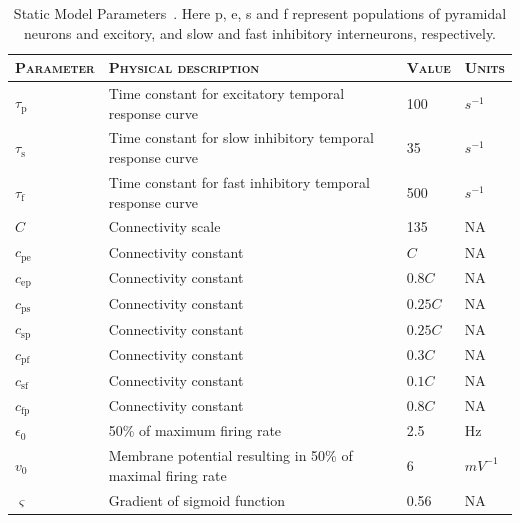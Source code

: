 \singlespacing 
\footnotesize
\begin{center}%
	\begin{table}
			\caption{Static Model Parameters~\citep{wendling2002epileptic}. Here p, e, s and f represent populations of pyramidal neurons and excitory, and slow and fast inhibitory interneurons, respectively.}
		\begin{tabular}{||p{2.5cm}|p{9cm}|p{1.2cm}|p{1cm}||}\hline
			 \textsc{Parameter}  & \textsc{Physical description} & \textsc{Value} & \textsc{Units}  \\\hline\hline
			 $\tau_{\mathrm{p}}$ & Time constant for excitatory temporal response curve & 100 & $s^{-1}$\\\hline
			 $\tau_{\mathrm{s}}$ & Time constant for slow inhibitory temporal response curve & 35 & $s^{-1}$\\\hline
			 $\tau_{\mathrm{f}}$ & Time constant for fast inhibitory temporal response curve & 500 & $s^{-1}$\\\hline
			 $C$ & Connectivity scale & 135 & NA\\\hline
			 $c_{\mathrm{pe}}$ & Connectivity constant  & $C$ & NA \\\hline
			 $c_{\mathrm{ep}}$ & Connectivity constant  & $0.8C$ & NA\\\hline
			 $c_{\mathrm{ps}}$ & Connectivity constant  & $0.25C$ & NA \\\hline
			 $c_{\mathrm{sp}}$ & Connectivity constant  & $0.25C$ & NA\\\hline
			 $c_{\mathrm{pf}}$ & Connectivity constant  & $0.3C$ & NA\\\hline
			 $c_{\mathrm{sf}}$ & Connectivity constant  & $0.1C$ & NA\\\hline
			 $c_{\mathrm{fp}}$ & Connectivity constant  & $0.8C$ & NA\\\hline
			 $\epsilon_{0}$ & 50\% of maximum firing rate & 2.5 & Hz \\\hline
			 $v_{0}$ & Membrane potential resulting in 50\% of maximal firing rate & 6 & $mV^{-1}$\\\hline
			 $\varsigma$ & Gradient of sigmoid function & 0.56 & NA \\\hline
		\end{tabular}
		\label{tab: Static}
	\end{table}
\end{center}%
\doublespacing
\normalsize

